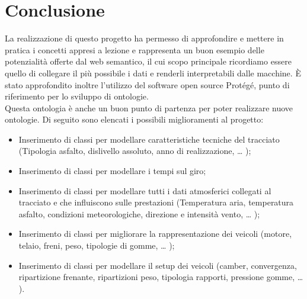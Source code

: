 \chapter{Conclusione}
La realizzazione di questo progetto ha permesso di approfondire e mettere in pratica i concetti appresi a lezione e rappresenta un buon esempio delle potenzialità offerte dal web semantico, il cui scopo principale ricordiamo essere quello di collegare il più possibile i dati e renderli interpretabili dalle macchine. È stato approfondito inoltre l'utilizzo del software open source Protégé, punto di riferimento per lo sviluppo di ontologie.
\\
Questa ontologia è anche un buon punto di partenza per poter realizzare nuove ontologie. Di seguito sono elencati i possibili miglioramenti al progetto:
\begin{itemize}
\item Inserimento di classi per modellare caratteristiche tecniche del tracciato (Tipologia asfalto, dislivello assoluto, anno di realizzazione, … );
\item Inserimento di classi per modellare i tempi sul giro;
\item Inserimento di classi per modellare tutti i dati atmosferici collegati al tracciato e che influiscono sulle prestazioni (Temperatura aria, temperatura asfalto, condizioni meteorologiche, direzione e intensità vento, … );
\item Inserimento di classi per migliorare la rappresentazione dei veicoli (motore, telaio, freni, peso, tipologie di gomme, … );
\item Inserimento di classi per modellare il setup dei veicoli (camber, convergenza, ripartizione frenante, ripartizioni peso, tipologia rapporti, pressione gomme, … ).
\end{itemize}




